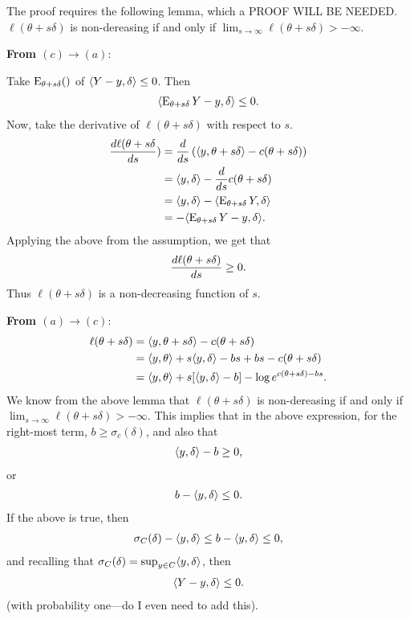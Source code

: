 The proof requires the following lemma, which a PROOF WILL BE NEEDED.
$\ell(\theta+s\delta)$ is non-dereasing if and only if $\lim_{s \to \infty} \ell
(\theta+s\delta) > -\infty$.

\textbf{From $(c) \to (a)$}:

Take $\operatorname{E}_{\theta + s \delta}()$ of $\langle Y-y, \delta \rangle \leq 0$.  Then
\begin{align*}
\langle  \operatorname{E}_{\theta + s \delta} Y-y, \delta \rangle \leq 0.
\end{align*}
Now, take the derivative of $\ell( \theta + s\delta)$ with respect to $s$.
\begin{align*}
\frac{d \ell( \theta + s \delta}{d s}) &= \frac{d }{d s} \left (   \langle y, \theta+s
\delta \rangle - c(\theta+s\delta)  \right )\\
	&= \langle y, \delta \rangle - \frac{d }{d s} c(\theta+s\delta) \\
	&= \langle y, \delta \rangle - \langle  \operatorname{E}_{\theta+s\delta}Y,\delta  \rangle\\
	&= - \langle  \operatorname{E}_{\theta+s\delta}Y - y,\delta  \rangle.
\end{align*}
Applying the above from the assumption, we get that 
\begin{align*}
\frac{d \ell( \theta + s \delta)}{d s} \geq 0.
\end{align*}
Thus $\ell(\theta+s\delta)$ is a non-decreasing function of $s$.

\textbf{From $(a) \to (c)$}:
\begin{align*}
	\ell( \theta+s\delta) &= \langle y, \theta+s\delta \rangle - c(\theta+s\delta) \\
	&= \langle y, \theta \rangle + s \langle y,\delta \rangle -bs +bs - c(\theta+s\delta) \\
	&= \langle y, \theta \rangle + s [\langle y,\delta \rangle -b]  - \log e^{c(\theta+s\delta) -bs}.
\end{align*}
We know from the above lemma that $\ell(\theta+s\delta)$ is non-dereasing if and only 
if $\lim_{s \to \infty} \ell(\theta+s\delta) > -\infty$.  This implies that in the 
above expression, for the right-most term, $b \geq \sigma_c(\delta)$, and also that
\begin{align*}
	\langle y, \delta \rangle - b \geq 0,
\end{align*}
or 
\begin{align*}
	b - \langle y, \delta \rangle  \leq 0.
\end{align*}
If the above is true, then 
\begin{align*}
	\sigma_C(\delta)  - \langle y, \delta \rangle \leq b - \langle y, \delta \rangle  \leq 0,
\end{align*}
and recalling that $\sigma_C(\delta) = \sup_{y \in C} \langle y, \delta \rangle$, then
\begin{align*}
	\langle Y - y,\delta  \rangle \leq 0.
\end{align*}
(with probability one---do I even need to add this).


